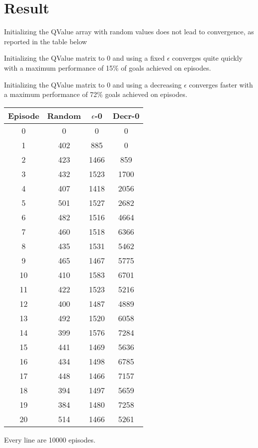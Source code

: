 \documentclass{article}
\begin{document}
\section{Result}

Initializing the QValue array with random values does not lead to convergence, as reported in the table below

Initializing the QValue matrix to 0 and using a fixed $\epsilon$ converges quite quickly with a maximum performance of 15\% of goals achieved on episodes.

Initializing the QValue matrix to 0 and using a decreasing $\epsilon$ converges faster with a maximum performance of 72\% goals achieved on episodes.

\begin{center}
\begin{tabular}{||c c c c||}
\hline
 Episode & Random & $\epsilon$-0 & Decr-0 \\ [0.5ex] 
\hline\hline
0 &   0 &   0 &   0 \\
1 &   402 &   885 &   0 \\
2 &   423 &   1466 &   859 \\
3 &   432 &   1523 &   1700 \\
4 &   407 &   1418 &   2056 \\
5 &   501 &   1527 &   2682 \\
6 &   482 &   1516 &   4664 \\
7 &   460 &   1518 &   6366 \\
8 &   435 &   1531 &   5462 \\
9 &   465 &   1467 &   5775 \\
10 &   410 &   1583 &   6701 \\
11 &   422 &   1523 &   5216 \\
12 &   400 &   1487 &   4889 \\
13 &   492 &   1520 &   6058 \\
14 &   399 &   1576 &   7284 \\
15 &   441 &   1469 &   5636 \\
16 &   434 &   1498 &   6785 \\
17 &   448 &   1466 &   7157 \\
18 &   394 &   1497 &   5659 \\
19 &   384 &   1480 &   7258 \\
20 &   514 &   1466 &   5261 \\
\hline\hline
\end{tabular}
\end{center}


Every line are 10000 episodes.
\end{document}
